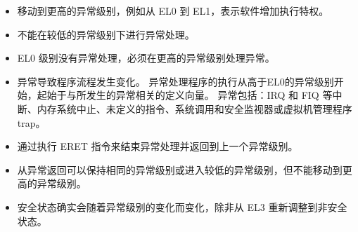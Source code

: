 \begin{itemize}
  \item 移动到更高的异常级别，例如从 EL0 到 EL1，表示软件增加执行特权。
  \item 不能在较低的异常级别下进行异常处理。
  \item EL0 级别没有异常处理，必须在更高的异常级别处理异常。
  \item 异常导致程序流程发生变化。
    异常处理程序的执行从高于EL0的异常级别开始，起始于与所发生的异常相关的定义向量。
    异常包括：IRQ 和 FIQ 等中断、内存系统中止、未定义的指令、系统调用和安全监视器或虚拟机管理程序 trap。
  \item 通过执行 ERET 指令来结束异常处理并返回到上一个异常级别。
  \item 从异常返回可以保持相同的异常级别或进入较低的异常级别，但不能移动到更高的异常级别。
  \item 安全状态确实会随着异常级别的变化而变化，除非从 EL3 重新调整到非安全状态。
\end{itemize}

